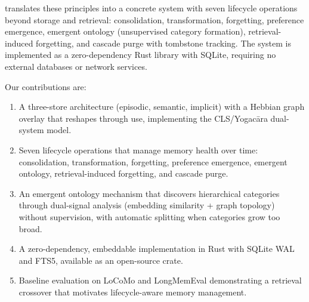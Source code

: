 \noindent \alaya{} translates these principles into a concrete system with
seven lifecycle operations beyond storage and retrieval: consolidation,
transformation, forgetting, preference emergence, emergent ontology
(unsupervised category formation), retrieval-induced forgetting, and
cascade purge with tombstone tracking. The system is implemented as a
zero-dependency Rust library with SQLite, requiring no external databases or
network services.

Our contributions are:
\begin{enumerate}[leftmargin=*, nosep]
    \item A three-store architecture (episodic, semantic, implicit) with a
    Hebbian graph overlay that reshapes through use, implementing the
    CLS/Yogac\=ara dual-system model.
    \item Seven lifecycle operations that manage memory health over time:
    consolidation, transformation, forgetting, preference emergence,
    emergent ontology, retrieval-induced forgetting, and cascade purge.
    \item An emergent ontology mechanism that discovers hierarchical
    categories through dual-signal analysis (embedding similarity + graph
    topology) without supervision, with automatic splitting when categories
    grow too broad.
    \item A zero-dependency, embeddable implementation in Rust with SQLite
    WAL and FTS5, available as an open-source crate.
    \item Baseline evaluation on LoCoMo and LongMemEval demonstrating a
    retrieval crossover that motivates lifecycle-aware memory management.
\end{enumerate}
